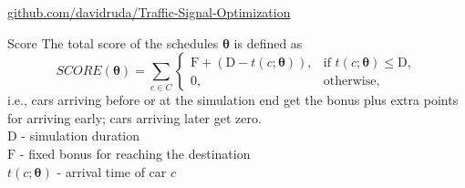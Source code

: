 \documentclass[portrait,a0paper,fontscale=0.28]{baposter}
\begin{document}
\begin{poster}
%
%
\begin{posterbox}[column=0, span=2, name=footer, below=something1,
	textborder=none, headerborder=none, boxheaderheight=0pt,
	boxColorOne=black!3]{}
\vspace{-1.5ex}
\hspace{0.5ex} \url{github.com/davidruda/Traffic-Signal-Optimization}
\end{posterbox}

%
%
%

\begin{posterbox}[column=1, name=something2, headerColorOne=yellow!80!orange!95!black, boxColorOne=yellow!33]
{Score}
The total score of the schedules $\bm{\theta}$ is defined as
\begin{equation*}
    SCORE(\bm{\theta}) = \sum_{c \in C}
	    \begin{cases}
        \mathrm{F} + (\mathrm{D} - t(c; \bm{\theta})), & \text{if $t(c; \bm{\theta}) \leq \mathrm{D}$}, \\
        0, & \text{otherwise},
    \end{cases}
\end{equation*}
i.e., cars arriving before or at the simulation end get the bonus plus extra points for arriving early; cars arriving later get zero. \\

$\mathrm{D}$ - simulation duration \\
$\mathrm{F}$ - fixed bonus for reaching the destination \\
$t(c; \bm{\theta})$ - arrival time of car $c$

\end{posterbox}


\end{poster}
\end{document}

